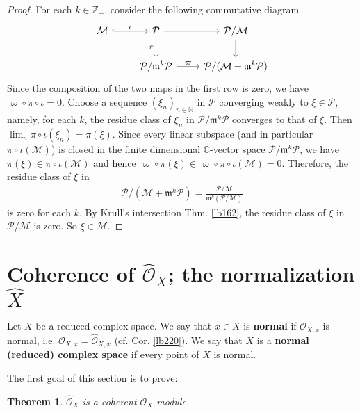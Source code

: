 \documentclass[12pt,b5paper,notitlepage]{report}
\theoremstyle{definition}
\theoremstyle{plain}
\newtheorem{thm}[df]{Theorem}
\newcommand{\mc}{\mathcal}
\newcommand{\wht}{\widehat}
\newcommand{\scr}{\mathscr}
\newcommand{\Cbb}{\mathbb C}
\newcommand{\Nbb}{\mathbb N}
\newcommand{\Zbb}{\mathbb Z}
\newcommand{\Owht}{\widehat{\scr O}}
\newcommand{\mk}{\mathfrak m}
\numberwithin{equation}{section}
\begin{document}
\begin{proof}
For each $k\in\Zbb_+$, consider the following commutative diagram
\begin{equation*}
\begin{tikzcd}
\mc M \arrow[r, hook,"\iota"] & \mc P \arrow[r] \arrow[d,"\pi"'] & \mc P/\mc M \arrow[d] \\
                  & \mc P/\mk^k\mc P \arrow[r,"\varpi"]           & \mc P/(\mc M+\mk^k\mc P)    
\end{tikzcd}
\end{equation*}
Since the composition of the two maps in the first row is zero, we have $\varpi\circ\pi\circ\iota=0$. Choose a sequence $(\xi_n)_{n\in\Nbb}$ in $\mc P$ converging weakly to $\xi\in\mc P$, namely, for each $k$, the residue class of $\xi_n$ in $\mc P/\mk^k\mc P$ converges to that of $\xi$. Then $\lim_n\pi\circ\iota(\xi_n)=\pi(\xi)$. Since every linear subspace (and in particular $\pi\circ\iota(\mc M)$) is  closed in the finite dimensional $\Cbb$-vector space $\mc P/\mk^k\mc P$, we have $\pi(\xi)\in\pi\circ\iota(\mc M)$ and hence $\varpi\circ\pi(\xi)\in\varpi\circ\pi\circ\iota(\mc M)=0$. Therefore, the residue class of $\xi$ in
\begin{align*}
\mc P/(\mc M+\mk^k\mc P)=\frac{\mc P/\mc M}{\mk^k(\mc P/\mc M)}
\end{align*}
is zero for each $k$. By Krull's intersection Thm. \ref{lb162}, the residue class of $\xi$ in $\mc P/\mc M$ is zero. So $\xi\in\mc M$.
\end{proof}







\section{Coherence of $\Owht_X$; the normalization $\wht X$}


Let $X$ be a reduced complex space. We say that $x\in X$ is \textbf{normal}  if $\scr O_{X,x}$ is normal, i.e. $\scr O_{X,x}=\Owht_{X,x}$ (cf. Cor. \ref{lb220}). We say that $X$ is a \textbf{normal (reduced) complex space}  if every point of $X$ is normal. 

The first goal of this section is to prove:

\begin{thm}\label{lb223}
$\Owht_X$ is a coherent $\scr O_X$-module.
\end{thm}
\end{document}
